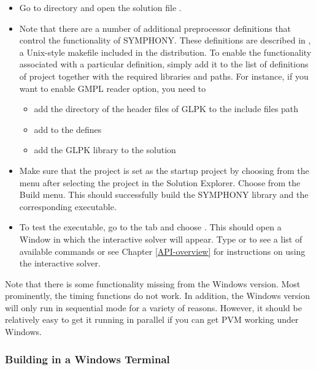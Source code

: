\begin{itemize}

\item Go to  directory and open the solution file
. 

\item Note that there are a number of additional preprocessor definitions that
control the functionality of SYMPHONY. These definitions are described in
, a Unix-style makefile included in the distribution. To 
enable the functionality associated with a particular definition, simply add 
it to the list of definitions of  project together with 
the required libraries and paths. For instance, if you 
want to enable GMPL reader option, you need to
\begin{itemize}
  \item add the directory of the header files of GLPK to the include 
files path
  \item add  to the defines
  \item add the GLPK library to the solution
\end{itemize}
\item Make sure that the project  is set as the startup project
by choosing  from the  menu after
selecting the  project in the Solution Explorer. Choose
 from the Build menu. This should successfully build
the SYMPHONY library and the corresponding executable.

\item To test the executable, go to the  tab and choose
. This should open a Window in which the
interactive solver will appear. Type  or  to see a list of
available commands or see Chapter \ref{API-overview} for instructions on using
the interactive solver.

\end{itemize}

Note that there is some functionality missing from the Windows version. Most
prominently, the timing functions do not work. In addition, the Windows
version will only run in sequential mode for a variety of reasons. However, it
should be relatively easy to get it running in parallel if you can get PVM
working under Windows. 

\subsubsection{Building in a Windows Terminal}
\label{using_msdev}


